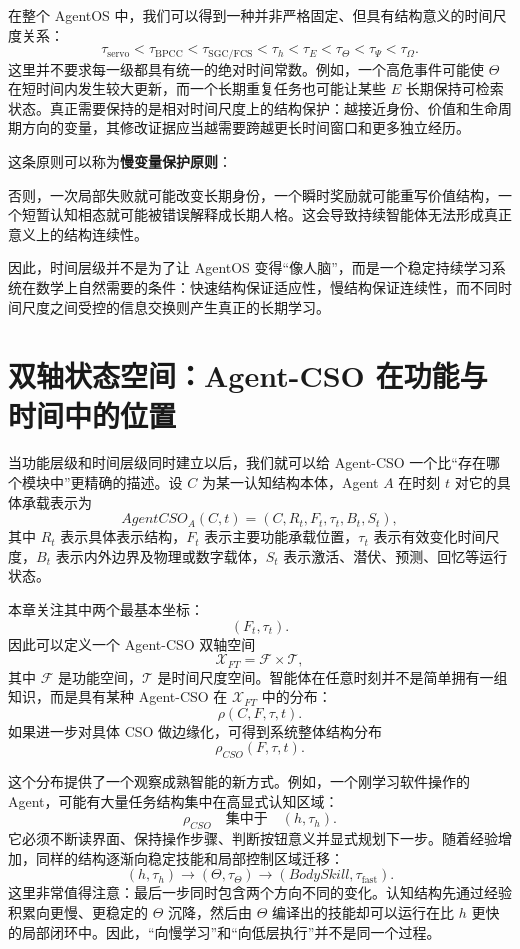 在整个 AgentOS 中，我们可以得到一种并非严格固定、但具有结构意义的时间尺度关系：
\[
\tau_{\mathrm{servo}}
<
\tau_{\mathrm{BPCC}}
<
\tau_{\mathrm{SGC/FCS}}
<
\tau_h
<
\tau_E
<
\tau_\Theta
<
\tau_\Psi
<
\tau_\Omega.
\]
这里并不要求每一级都具有统一的绝对时间常数。例如，一个高危事件可能使 $\Theta$ 在短时间内发生较大更新，而一个长期重复任务也可能让某些 $E$ 长期保持可检索状态。真正需要保持的是相对时间尺度上的结构保护：越接近身份、价值和生命周期方向的变量，其修改证据应当越需要跨越更长时间窗口和更多独立经历。

这条原则可以称为\textbf{慢变量保护原则}：
\begin{statementbox}
\centering
{}
\end{statementbox}
否则，一次局部失败就可能改变长期身份，一个瞬时奖励就可能重写价值结构，一个短暂认知相态就可能被错误解释成长期人格。这会导致持续智能体无法形成真正意义上的结构连续性。

因此，时间层级并不是为了让 AgentOS 变得“像人脑”，而是一个稳定持续学习系统在数学上自然需要的条件：快速结构保证适应性，慢结构保证连续性，而不同时间尺度之间受控的信息交换则产生真正的长期学习。


\section{双轴状态空间：Agent-CSO 在功能与时间中的位置}

当功能层级和时间层级同时建立以后，我们就可以给 Agent-CSO 一个比“存在哪个模块中”更精确的描述。设 $C$ 为某一认知结构本体，Agent $A$ 在时刻 $t$ 对它的具体承载表示为
\[
AgentCSO_A(C,t)
=
(C,R_t,F_t,\tau_t,B_t,S_t),
\]
其中 $R_t$ 表示具体表示结构，$F_t$ 表示主要功能承载位置，$\tau_t$ 表示有效变化时间尺度，$B_t$ 表示内外边界及物理或数字载体，$S_t$ 表示激活、潜伏、预测、回忆等运行状态。

本章关注其中两个最基本坐标：
\[
(F_t,\tau_t).
\]
因此可以定义一个 Agent-CSO 双轴空间
\[
\mathcal X_{FT}
=
\mathcal F\times\mathcal T,
\]
其中 $\mathcal F$ 是功能空间，$\mathcal T$ 是时间尺度空间。智能体在任意时刻并不是简单拥有一组知识，而是具有某种 Agent-CSO 在 $\mathcal X_{FT}$ 中的分布：
\[
\rho(C,F,\tau,t).
\]
如果进一步对具体 CSO 做边缘化，可得到系统整体结构分布
\[
\rho_{CSO}(F,\tau,t).
\]

这个分布提供了一个观察成熟智能的新方式。例如，一个刚学习软件操作的 Agent，可能有大量任务结构集中在高显式认知区域：
\[
\rho_{CSO}
\quad
\text{集中于}
\quad
(h,\tau_h).
\]
它必须不断读界面、保持操作步骤、判断按钮意义并显式规划下一步。随着经验增加，同样的结构逐渐向稳定技能和局部控制区域迁移：
\[
(h,\tau_h)
\rightarrow
(\Theta,\tau_\Theta)
\rightarrow
(BodySkill,\tau_{\mathrm{fast}}).
\]
这里非常值得注意：最后一步同时包含两个方向不同的变化。认知结构先通过经验积累向更慢、更稳定的 $\Theta$ 沉降，然后由 $\Theta$ 编译出的技能却可以运行在比 $h$ 更快的局部闭环中。因此，“向慢学习”和“向低层执行”并不是同一个过程。

